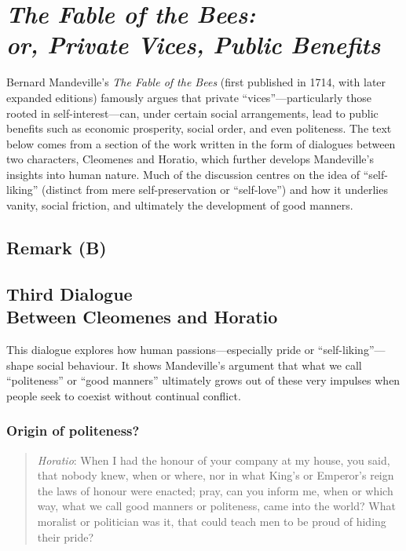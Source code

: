 \section[\textit{The Fable of the Bees}]{\textit{The Fable of the Bees:} \\ \textit{or, Private Vices, Public Benefits}}

    Bernard Mandeville’s \textit{The Fable of the Bees} (first published in 1714, with later expanded editions) famously argues that private “vices”—particularly those rooted in self-interest—can, under certain social arrangements, lead to public benefits such as economic prosperity, social order, and even politeness. The text below comes from a section of the work written in the form of dialogues between two characters, Cleomenes and Horatio, which further develops Mandeville’s insights into human nature. Much of the discussion centres on the idea of “self-liking” (distinct from mere self-preservation or “self-love”) and how it underlies vanity, social friction, and ultimately the development of good manners.

    \subsection{Remark (B)}

    \subsection[Third Dialogue Between Cleomenes and Horatio]{Third Dialogue \\ Between Cleomenes and Horatio}

        This dialogue explores how human passions—especially pride or “self-liking”—shape social behaviour. It shows Mandeville’s argument that what we call “politeness” or “good manners” ultimately grows out of these very impulses when people seek to coexist without continual conflict.

        \subsubsection{Origin of politeness?}

            \begin{quote}
                \textit{Horatio}: When I had the honour of your company at my house, you said, that nobody knew, when or where, nor in what King’s or Emperor’s reign the laws of honour were enacted; pray, can you inform me, when or which way, what we call good manners or politeness, came into the world? What moralist or politician was it, that could teach men to be proud of hiding their pride?
            \end{quote}

